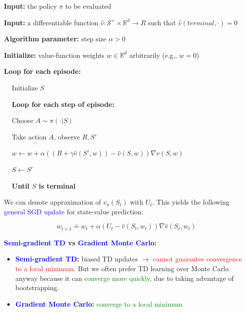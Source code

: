 \documentclass[12pt, a4paper]{article}
\begin{document}
\begin{tcolorbox}[title={Semi-gradient TD(0) for estimating $\hat{v} \approx v_\pi$}]

  \textbf{Input:} the policy $\pi$ to be evaluated

  \textbf{Input:} a differentiable function $\hat{v}: \mathcal{S}^+ \times \mathbb{R}^d \to R$ such that $\hat{v}(terminal,\cdot) = 0$

  \textbf{Algorithm parameter:} step size $\alpha > 0$

  \textbf{Initialize:} value-function weights $w \in \mathbb{R}^d$ arbitrarily (e.g., $w=0$)

  \textbf{Loop for each episode:}
  \begin{description}
      \item $\;\;\;$ Initialize $S$
      \item $\;\;\;$ \textbf{Loop for each step of episode:}
      \begin{description}
        \item $\;\;\;$ Choose $A \sim \pi(\cdot | S)$
        \item $\;\;\;$ Take action $A$, observe $R, S'$
        \item $\;\;\;$ $w \leftarrow w + \alpha ((R + \gamma \hat{v}(S',w)) -\hat{v}(S, w)) \nabla \hat{v}(S, w)$
        \item $\;\;\;$ $S \leftarrow S'$
      \end{description}
      \item $\;\;\;$ \textbf{Until $S$ is terminal}
  \end{description}
\end{tcolorbox}


We can denote approximation of $v_\pi(S_t)$ with $U_t$. This yields the following \textcolor{blue}{general SGD update} for state-value prediction:

$$
w_{t+1} \doteq w_t + \alpha (U_t - \hat{v}(S_t,w_t)) \nabla \hat{v}(S_t, w_t)
$$



\textbf{\textcolor{blue}{Semi-gradient TD} vs \textcolor{blue}{Gradient Monte Carlo}:}
\begin{itemize}
  \item \textbf{\textcolor{blue}{Semi-gradient TD}:} biased TD updates $\rightarrow$ \textcolor{red}{cannot guarantee convergence to a local minimum}. But we often prefer TD learning over Monte Carlo anyway because it can \textcolor{Green}{converge more quickly}, due to taking advantage of bootstrapping.
  \item \textbf{\textcolor{blue}{Gradient Monte Carlo}:} \textcolor{Green}{converge to a local minimum}
\end{itemize}
\end{document}
